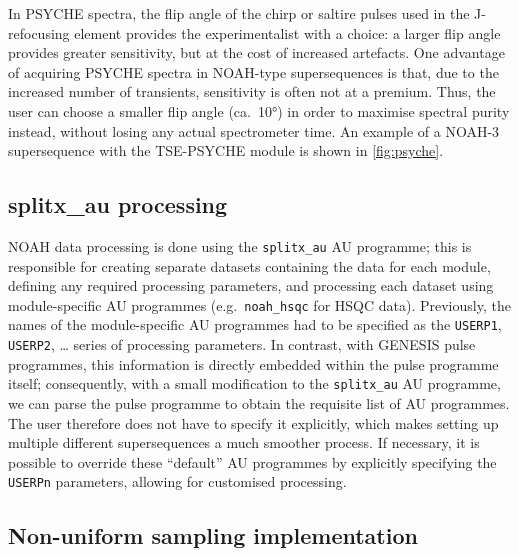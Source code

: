 \documentclass[a4paper,11pt]{article}
\newcommand{\carbon}{\ch{^{13}C}}
\begin{document}
\begin{refsection}
In PSYCHE spectra, the flip angle of the chirp or saltire pulses used in the J-refocusing element provides the experimentalist with a choice: a larger flip angle provides greater sensitivity, but at the cost of increased artefacts.\autocite{Foroozandeh2018CEJ}
One advantage of acquiring PSYCHE spectra in NOAH-type supersequences is that, due to the increased number of transients, sensitivity is often not at a premium.
Thus, the user can choose a smaller flip angle (ca.\ \ang{10}) in order to maximise spectral purity instead, without losing any actual spectrometer time.
An example of a NOAH-3 supersequence with the TSE-PSYCHE module is shown in \cref{fig:psyche}.

\subsection{splitx\_au processing}
\label{subsec:splitx_au}

NOAH data processing is done using the \texttt{splitx\_au} AU programme; this is responsible for creating separate datasets containing the data for each module, defining any required processing parameters, and processing each dataset using module-specific AU programmes (e.g.\ \texttt{noah\_hsqc} for \carbon{} HSQC data).
Previously, the names of the module-specific AU programmes had to be specified as the \texttt{USERP1}, \texttt{USERP2}, \ldots{} series of processing parameters.
In contrast, with GENESIS pulse programmes, this information is directly embedded within the pulse programme itself; consequently, with a small modification to the \texttt{splitx\_au} AU programme, we can parse the pulse programme to obtain the requisite list of AU programmes.
The user therefore does not have to specify it explicitly, which makes setting up multiple different supersequences a much smoother process.
If necessary, it is possible to override these ``default'' AU programmes by explicitly specifying the \texttt{USERPn} parameters, allowing for customised processing.

\subsection{Non-uniform sampling implementation}
\label{subsec:nus}


\end{refsection}
\end{document}
